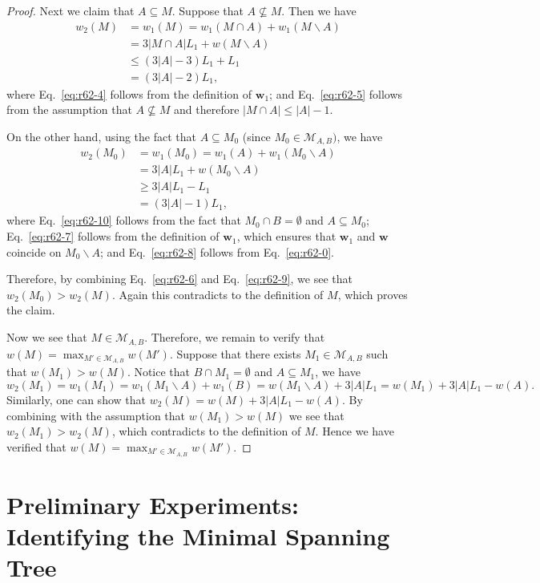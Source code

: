 \documentclass{article}
\newcommand{\M}{\mathcal M}
\newcommand{\del}{\backslash}
\renewcommand{\vec}[1]{\boldsymbol{#1}}
\begin{document}
\begin{proof}
Next we claim that $A \subseteq M$. Suppose that $A\not\subseteq M$. 
Then we have
\begin{align}
	w_2(M) &= w_1(M) = w_1(M\cap A)+w_1(M\del A) \nonumber \\
				 &= 3|M\cap A| L_1 + w(M\del A) \label{eq:r62-4}\\
				 &\le (3|A|-3) L_1+L_1 \label{eq:r62-5}\\
				 &= (3|A|-2)L_1, \label{eq:r62-6}
\end{align}
where Eq.~\eqref{eq:r62-4} follows from the definition of $\vec w_1$;
and Eq.~\eqref{eq:r62-5} follows from the assumption that $A\not\subseteq M$ and therefore $|M\cap A| \le |A|-1$.

On the other hand, using the fact that $A\subseteq M_0$ (since $M_0\in \M_{A,B})$, we have
\begin{align}
w_2(M_0) &= w_1(M_0) = w_1(A)+w_1(M_0 \del A) \label{eq:r62-10}\\
	 		   &= 3|A| L_1+w(M_0\del A)\label{eq:r62-7}\\
	 		   &\ge 3|A| L_1-L_1\label{eq:r62-8}\\
	 		   &= (3|A|-1)L_1, \label{eq:r62-9} 	 		   
\end{align}
where Eq.~\eqref{eq:r62-10} follows from the fact that $M_0\cap B=\emptyset$ and $A\subseteq M_0$;
Eq.~\eqref{eq:r62-7} follows from the definition of $\vec w_1$, which ensures that $\vec w_1$ and $\vec w$ coincide on $M_0\del A$;
and Eq.~\eqref{eq:r62-8} follows from Eq.~\eqref{eq:r62-0}.

Therefore, by combining Eq.~\eqref{eq:r62-6} and Eq.~\eqref{eq:r62-9}, we see that $w_2(M_0) > w_2(M)$. 
Again this contradicts to the definition of $M$, which proves the claim.


Now we see that $M\in \M_{A,B}$. 
Therefore, we remain to verify that $w(M) = \max_{M'\in\M_{A,B}} w(M')$.
Suppose that there exists $M_1\in \M_{A,B}$ such that $w(M_1) > w(M)$.
Notice that $B\cap M_1=\emptyset$ and $A\subseteq M_1$, we have
$$
w_2(M_1) = w_1(M_1) = w_1(M_1\del A)+w_1(B) = w(M_1\del A)+3|A|L_1 = w(M_1)+3|A|L_1-w(A).
$$
Similarly, one can show that $w_2(M) = w(M)+3|A|L_1-w(A)$.
By combining with the assumption that $w(M_1) > w(M)$
we see that $w_2(M_1) > w_2(M)$, which contradicts to the definition of $M$. 
Hence we have verified that $w(M) = \max_{M'\in\M_{A,B}} w(M')$.
\end{proof}

\section{Preliminary Experiments: Identifying the Minimal Spanning Tree}
\label{section:experiment}
\end{document}
